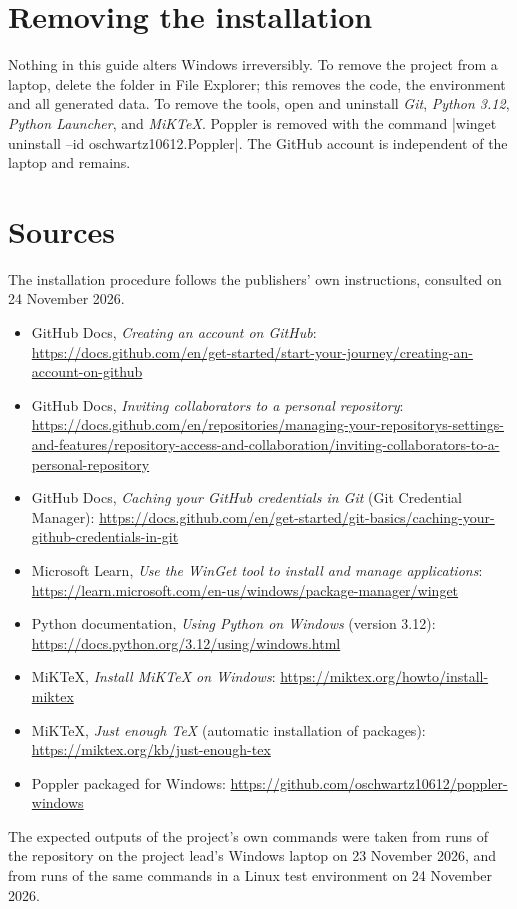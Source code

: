 \section{Removing the installation}

Nothing in this guide alters Windows irreversibly. To remove the project from a laptop, delete
the folder  in File Explorer; this removes the code, the environment and all
generated data. To remove the tools, open \then{}\then{} and uninstall \emph{Git}, \emph{Python 3.12}, \emph{Python Launcher}, and \emph{MiKTeX}.
Poppler is removed with the command
\code|winget uninstall --id oschwartz10612.Poppler|. The GitHub account is independent of the
laptop and remains.

\section{Sources}

The installation procedure follows the publishers' own instructions, consulted on 24 November
2026.
\begin{itemize}
\item GitHub Docs, \emph{Creating an account on GitHub}:
  \url{https://docs.github.com/en/get-started/start-your-journey/creating-an-account-on-github}
\item GitHub Docs, \emph{Inviting collaborators to a personal repository}:
  \url{https://docs.github.com/en/repositories/managing-your-repositorys-settings-and-features/repository-access-and-collaboration/inviting-collaborators-to-a-personal-repository}
\item GitHub Docs, \emph{Caching your GitHub credentials in Git} (Git Credential Manager):
  \url{https://docs.github.com/en/get-started/git-basics/caching-your-github-credentials-in-git}
\item Microsoft Learn, \emph{Use the WinGet tool to install and manage applications}:
  \url{https://learn.microsoft.com/en-us/windows/package-manager/winget}
\item Python documentation, \emph{Using Python on Windows} (version 3.12):
  \url{https://docs.python.org/3.12/using/windows.html}
\item MiKTeX, \emph{Install MiKTeX on Windows}: \url{https://miktex.org/howto/install-miktex}
\item MiKTeX, \emph{Just enough TeX} (automatic installation of packages):
  \url{https://miktex.org/kb/just-enough-tex}
\item Poppler packaged for Windows: \url{https://github.com/oschwartz10612/poppler-windows}
\end{itemize}
The expected outputs of the project's own commands were taken from runs of the repository on the
project lead's Windows laptop on 23 November 2026, and from runs of the same commands in a Linux
test environment on 24 November 2026.
